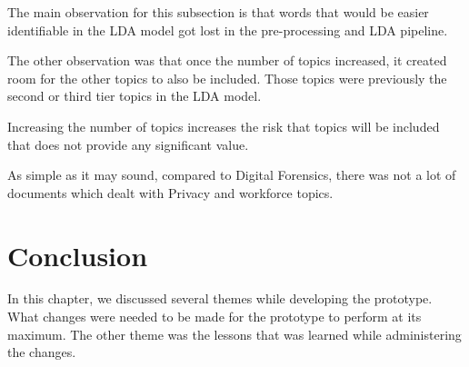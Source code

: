\begin{table}[]
\centering
{}
\caption{Similarity for "Privacy" topic}
\label{tab:digitalforensicsBA}
\end{table}
The main observation for this subsection is that words that would be easier identifiable in the LDA model got lost in the pre-processing and LDA pipeline. 

The other observation was that once the number of topics increased, it created room for the other topics to also be included. Those topics were previously the second or third tier topics in the LDA model. 

\begin{lesson}
Increasing the number of topics increases the risk that topics will be included that does not provide any significant value.
\end{lesson}\label{L:more}

As simple as it may sound, compared to Digital Forensics, there was not a lot of documents which dealt with Privacy and workforce topics.

\section{Conclusion}

In this chapter, we discussed several themes while developing the prototype. What changes were needed to be made for the prototype to perform at its maximum. The other theme was the lessons that was learned while administering the changes. 

